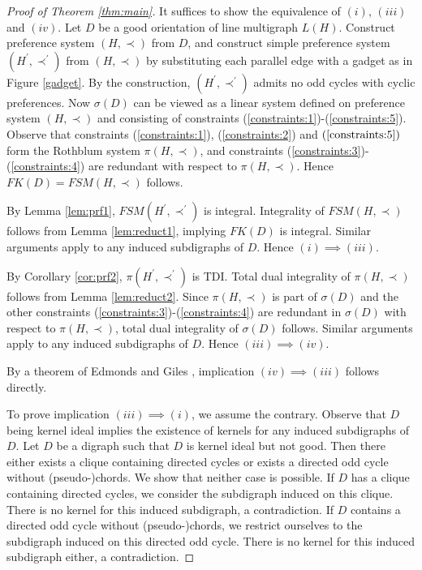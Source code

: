 \documentclass[11pt]{article}
\numberwithin{theorem}{section}
\begin{document}
\begin{proof}[Proof of Theorem \ref{thm:main}]
It suffices to show the equivalence of $(i)$, $(iii)$ and $(iv)$. Let $D$ be a good orientation of line multigraph $L(H)$.
Construct preference system $(H,\prec)$ from $D$, and construct simple preference system $(H^\prime,\prec^\prime)$ from $(H,\prec)$ by substituting each parallel edge with a gadget as in Figure \ref{gadget}.
By the construction, $(H^\prime,\prec^\prime)$ admits no odd cycles with cyclic preferences.
Now $\sigma(D)$ can be viewed as a linear system defined on preference system $(H,\prec)$ and consisting of constraints (\ref{constraints:1})-(\ref{constraints:5}).
Observe that constraints (\ref{constraints:1}), (\ref{constraints:2}) and $(\ref{constraints:5})$ form the Rothblum system $\pi(H,\prec)$, and constraints (\ref{constraints:3})-(\ref{constraints:4}) are redundant with respect to $\pi(H,\prec)$.
Hence $FK(D)=FSM(H,\prec)$ follows.

By Lemma \ref{lem:prf1}, $FSM(H^\prime,\prec^\prime)$ is integral.
Integrality of $FSM(H,\prec)$ follows from Lemma \ref{lem:reduct1}, implying $FK(D)$ is integral.
Similar arguments apply to any induced subdigraphs of $D$. Hence $(i)\implies (iii)$.

By Corollary \ref{cor:prf2}, $\pi(H^\prime,\prec^\prime)$ is TDI.
Total dual integrality of $\pi(H,\prec)$ follows from Lemma \ref{lem:reduct2}.
Since $\pi(H,\prec)$ is part of $\sigma(D)$ and the other constraints (\ref{constraints:3})-(\ref{constraints:4}) are redundant in $\sigma(D)$ with respect to $\pi(H,\prec)$, total dual integrality of $\sigma(D)$ follows. Similar arguments apply to any induced subdigraphs of $D$. Hence $(iii)\implies (iv)$.

By a theorem of Edmonds and Giles \cite{EdmoGile77}, implication $(iv)\implies (iii)$ follows directly.

To prove implication $(iii)\implies (i)$, we assume the contrary.
Observe that $D$ being kernel ideal implies the existence of kernels for any induced subdigraphs of $D$.
Let $D$ be a digraph such that $D$ is kernel ideal but not good.
Then there either exists a clique containing directed cycles or exists a directed odd cycle without (pseudo-)chords.
We show that neither case is possible.
If $D$ has a clique containing directed cycles, we consider the subdigraph induced on this clique.
There is no kernel for this induced subdigraph, a contradiction.
If $D$ contains a directed odd cycle without (pseudo-)chords, we restrict ourselves to the subdigraph induced on this directed odd cycle.
There is no kernel for this induced subdigraph either, a contradiction.
\end{proof}
\end{document}
